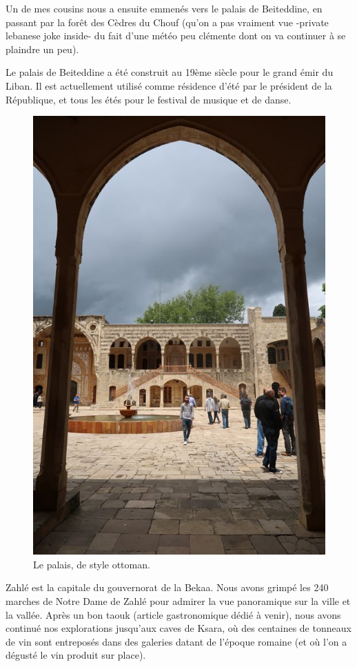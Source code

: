 Un de mes cousins nous a ensuite emmenés vers le palais de Beiteddine,
en passant par la forêt des Cèdres du Chouf (qu'on a pas vraiment vue
-private lebanese joke inside- du fait d'une météo peu clémente dont on
va continuer à se plaindre un peu).

Le palais de Beiteddine a été construit au 19ème siècle pour le grand
émir du Liban. Il est actuellement utilisé comme résidence d'été par le
président de la République, et tous les étés pour le festival de musique
et de danse.

\begin{figure}
\centering
\includegraphics{images/20180517_beiteddine.jpg}
\caption{Le palais, de style ottoman.}
\end{figure}

Zahlé est la capitale du gouvernorat de la Bekaa. Nous avons grimpé les
240 marches de Notre Dame de Zahlé pour admirer la vue panoramique sur
la ville et la vallée. Après un bon taouk (article gastronomique dédié à
venir), nous avons continué nos explorations jusqu'aux caves de Ksara,
où des centaines de tonneaux de vin sont entreposés dans des galeries
datant de l'époque romaine (et où l'on a dégusté le vin produit sur
place).

